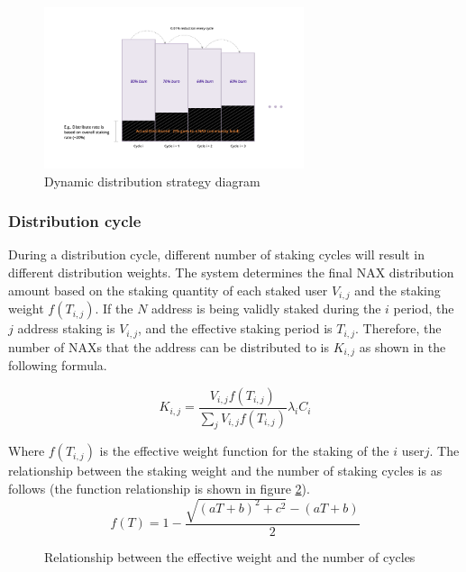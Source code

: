 \begin{figure}[htbp]
  \centering
  \includegraphics[width=0.68\textwidth]{../common/dynamic_dist.pdf}
  \caption{Dynamic distribution strategy diagram\label{fig:dynamic_dist}}
\end{figure}

\subsubsection{Distribution cycle}
During a distribution cycle, different number of staking cycles will result in different distribution weights. The system determines the final NAX distribution amount based on the staking quantity of each staked user $V_{i, j}$ and the staking weight \(f(T_{i, j})\). If the $N$ address is being validly staked during the $i$ period, the $j$ address staking is $V_{i,j}$, and the effective staking period is $T_{i,j}$. Therefore, the number of NAXs that the address can be distributed to is $K_{i,j}$ as shown in the following formula.

\begin{equation}
  K_{i,j} = \frac{V_{i,j} f(T_{i,j})}{\sum_j V_{i,j} f(T_{i,j})} \lambda_i C_i
\end{equation}

Where \(f(T_{i,j})\) is the effective weight function for the staking of the \(i\) user\(j\). The relationship between the staking weight and the number of staking cycles is as follows (the function relationship is shown in figure \ref{weight}).
\begin{equation}
  f(T) = 1 - \frac{\sqrt{(aT+b)^2+c^2}-(aT+b)}{2}
\end{equation}

\begin{figure}[h]
\centering
\caption{Relationship between the effective weight and the number of cycles}\label{weight}
\end{figure}

